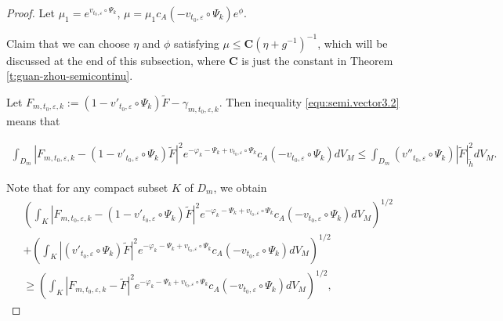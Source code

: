 \begin{proof}
Let $\mu_{1}=e^{v_{t_0,\varepsilon}\circ\Psi_{k}}$, $\mu=\mu_{1}c_{A}(-v_{t_0,\varepsilon}\circ\Psi_{k})e^{\phi}$.

Claim that we can choose $\eta$ and $\phi$ satisfying $\mu\leq
\mathbf{C}(\eta+g^{-1})^{-1}$, which will be discussed at the end of
this subsection, where $\mathbf{C}$ is just the constant in Theorem
\ref{t:guan-zhou-semicontinu}.

Let $F_{m,t_0,\varepsilon,k}:=(1-v'_{t_0,\varepsilon}\circ\Psi_{k})\widetilde{F}-\gamma_{m,t_0,\varepsilon,k}$.
Then inequality \ref{equ:semi.vector3.2} means that

\begin{equation}
 \label{equ:semi.3.30}
 \begin{split}
 \int_{ D_m}|F_{m,t_0,\varepsilon,k}-(1-v'_{t_0,\varepsilon}\circ\Psi_{k})\widetilde{F}|^{2}e^{-\varphi_{k}-
 \Psi_{k}+v_{t_0,\varepsilon}\circ\Psi_{k}}c_{A}(-v_{t_0,\varepsilon}\circ\Psi_{k})dV_{M}
\leq\int_{D_m}(v''_{t_0,\varepsilon}\circ{\Psi_{k}})| \tilde{F}|^2_{\tilde{h}}dV_M.
  \end{split}
\end{equation}

Note that for any compact subset $K$ of $D_{m}$, we obtain
\begin{equation}
 \label{equ:semi.3.30.2}
 \begin{split}
 &(\int_{K}|F_{m,t_0,\varepsilon,k}-(1-v'_{t_0,\varepsilon}\circ\Psi_{k})\widetilde{F}|^{2}
 e^{-\varphi_{k}-\Psi_{k}+v_{t_0,\varepsilon}\circ\Psi_{k}}c_{A}(-v_{t_0,\varepsilon}\circ\Psi_{k})dV_{M})^{1/2}
 \\&+(\int_{K}|(v'_{t_0,\varepsilon}\circ\Psi_{k})\widetilde{F}|^{2}
 e^{-\varphi_{k}-\Psi_{k}+v_{t_0,\varepsilon}\circ\Psi_{k}}c_{A}(-v_{t_0,\varepsilon}\circ\Psi_{k})dV_{M})^{1/2}
  \\&\geq(\int_{K}|F_{m,t_0,\varepsilon,k}-\widetilde{F}|^{2}
 e^{-\varphi_{k}-\Psi_{k}+v_{t_0,\varepsilon}\circ\Psi_{k}}c_{A}(-v_{t_0,\varepsilon}\circ\Psi_{k})dV_{M})^{1/2},
  \end{split}
\end{equation}


\end{proof}
